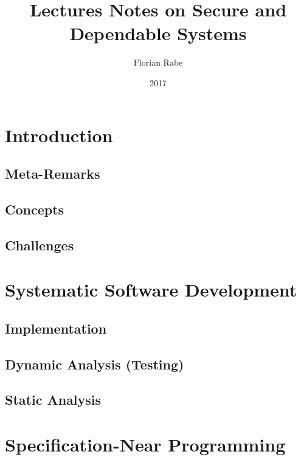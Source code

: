 \documentclass{book}
\title{Lectures Notes on Secure and Dependable Systems}
\author{Florian Rabe}
\date{2017}
\begin{document}
\maketitle

\tableofcontents
\newpage

\part{Introduction}

 \chapter{Meta-Remarks}
  

  \chapter{Concepts}
   

 \chapter{Challenges}
   

\part{Systematic Software Development}

  \chapter{Implementation}\label{sec:sd:systimpl}
    

  \chapter{Dynamic Analysis (Testing)}\label{sec:sd:dynamic}
    

  \chapter{Static Analysis}\label{sec:sd:static}
    
    
\part{Specification-Near Programming}
\end{document}
